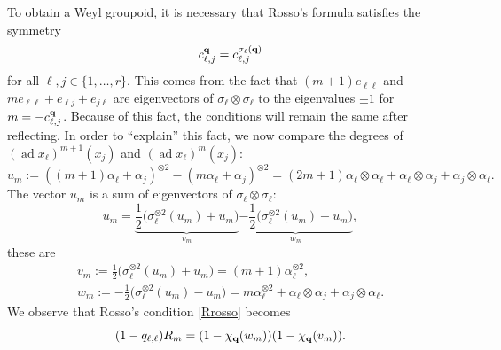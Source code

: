 \documentclass[pdftex]{sigma}
\numberwithin{equation}{section}
\newcommand{\qq }{{\bf q}}
\DeclareMathOperator{\ad}{ad}
\newcommand{\bich }{\chi}
\begin{document}
To obtain a Weyl groupoid, it is necessary that Rosso's formula satisfies the symmetry
\begin{gather*}%
c^\qq_{\ell,j} = c^{\sigma_\ell(\qq)}_{\ell,j}
\end{gather*}
for all $\ell,j\in \{1,\dots,r\}$. This comes from the fact that
$(m+1) e_{\ell \ell}$ and $m e_{\ell \ell}+e_{\ell j}+e_{j \ell}$ are eigenvectors of $\sigma_\ell \otimes \sigma_\ell$ to the eigenvalues $\pm 1$ for $m = -c^\qq_{\ell,j}$.
Because of this fact, the conditions will remain the same after reflecting.
In order to ``explain'' this fact, we now compare the degrees of $(\ad x_\ell)^{m+1}(x_j)$ and $(\ad x_\ell)^{m}(x_j)$:
\[ u_m := ((m+1)\alpha_\ell+\alpha_j)^{\otimes 2} - (m\alpha_\ell+\alpha_j)^{\otimes 2} = (2m+1)\alpha_\ell\otimes\alpha_\ell + \alpha_\ell\otimes \alpha_j + \alpha_j\otimes \alpha_\ell. \]
The vector $u_m$ is a sum of eigenvectors of $\sigma_\ell\otimes\sigma_\ell$:
\[ u_m = \underbrace{\frac{1}{2}\big(\sigma_\ell^{\otimes 2}(u_m)+u_m\big)}_{v_m}
\underbrace{-\frac{1}{2}\big(\sigma_\ell^{\otimes 2}(u_m)-u_m\big)}_{w_m}
, \]
these are
\begin{gather*}
v_m := \frac{1}{2}\big(\sigma_\ell^{\otimes 2}(u_m)+u_m\big)
 = (m+1)\alpha_\ell^{\otimes 2}
, \\
w_m := -\frac{1}{2}\big(\sigma_\ell^{\otimes 2}(u_m)-u_m\big)
 = m\alpha_\ell^{\otimes 2}+\alpha_\ell\otimes \alpha_j + \alpha_j\otimes \alpha_\ell.
\end{gather*}
We observe that Rosso's condition \eqref{Rrosso} becomes
\begin{equation}\label{R_add}
(1-q_{\ell,\ell})R_{m} = (1-\bich_\qq(w_m))(1-\bich_\qq(v_m)).
\end{equation}
\end{document}
